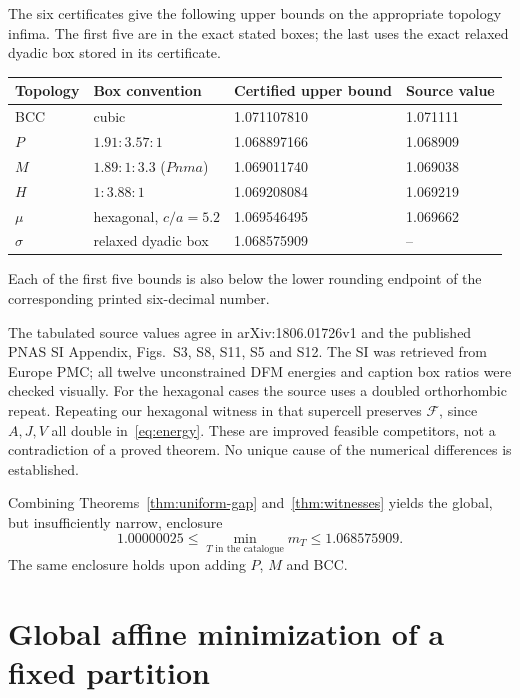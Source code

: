 \documentclass[11pt,a4paper]{report}
\newcommand{\DF}{\mathcal F}
\begin{document}
\begin{theorem}\label{thm:witnesses}
The six certificates give the following upper bounds on the appropriate
topology infima. The first five are in the exact stated boxes; the last
uses the exact relaxed dyadic box stored in its certificate.
\begin{center}
\begin{tabular}{llll}
\toprule
Topology & Box convention & Certified upper bound & Source value\\
\midrule
BCC & cubic & 1.071107810 & 1.071111\\
$P$ & $1.91:3.57:1$ & 1.068897166 & 1.068909\\
$M$ & $1.89:1:3.3$ ($Pnma$) & 1.069011740 & 1.069038\\
$H$ & $1:3.88:1$ & 1.069208084 & 1.069219\\
$\mu$ & hexagonal, $c/a=5.2$ & 1.069546495 & 1.069662\\
$\sigma$ & relaxed dyadic box & 1.068575909 & --\\
\bottomrule
\end{tabular}
\end{center}
Each of the first five bounds is also below the lower rounding endpoint
of the corresponding printed six-decimal number.
\end{theorem}

The tabulated source values agree in arXiv:1806.01726v1 and the published
PNAS SI Appendix, Figs.~S3, S8, S11, S5 and S12. The SI was retrieved from
Europe PMC; all twelve unconstrained DFM energies and caption box ratios
were checked visually. For the hexagonal cases the source uses a doubled
orthorhombic repeat. Repeating our hexagonal witness in that supercell
preserves $\DF$, since $A,J,V$ all double in~\eqref{eq:energy}.
These are improved feasible competitors, not a contradiction of a proved
theorem. No unique cause of the numerical differences is established.

Combining Theorems~\ref{thm:uniform-gap} and~\ref{thm:witnesses} yields the global,
but insufficiently narrow, enclosure
\begin{equation}\label{eq:global}
 1.00000025\leq\min_{T\text{ in the catalogue}}m_T\leq1.068575909.
\end{equation}
The same enclosure holds upon adding $P$, $M$ and BCC.

\section{Global affine minimization of a fixed partition}\label{sec:affine}
\end{document}
